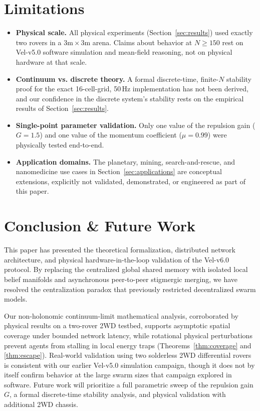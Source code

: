 \documentclass[journal,twoside]{IEEEtran}
\begin{document}
\section{Limitations}
\label{sec:limitations}

\begin{itemize}
    \item \textbf{Physical scale.} All physical experiments (Section~\ref{sec:results}) used exactly two rovers in a $3\text{m} \times 3\text{m}$ arena. Claims about behavior at $N \geq 150$ rest on Vel-v5.0 software simulation and mean-field reasoning, not on physical hardware at that scale.
    \item \textbf{Continuum vs. discrete theory.} A formal discrete-time, finite-$N$ stability proof for the exact 16-cell-grid, 50\,Hz implementation has not been derived, and our confidence in the discrete system's stability rests on the empirical results of Section~\ref{sec:results}.
    \item \textbf{Single-point parameter validation.} Only one value of the repulsion gain ($G = 1.5$) and one value of the momentum coefficient ($\mu = 0.99$) were physically tested end-to-end.
    \item \textbf{Application domains.} The planetary, mining, search-and-rescue, and nanomedicine use cases in Section~\ref{sec:applications} are conceptual extensions, explicitly not validated, demonstrated, or engineered as part of this paper.
\end{itemize}

\section{Conclusion \& Future Work}
\label{sec:conclusion}

This paper has presented the theoretical formalization, distributed network architecture, and physical hardware-in-the-loop validation of the Vel-v6.0 protocol. By replacing the centralized global shared memory with isolated local belief manifolds and asynchronous peer-to-peer stigmergic merging, we have resolved the centralization paradox that previously restricted decentralized swarm models.

Our non-holonomic continuum-limit mathematical analysis, corroborated by physical results on a two-rover 2WD testbed, supports asymptotic spatial coverage under bounded network latency, while rotational physical perturbations prevent agents from stalling in local energy traps (Theorems~\ref{thm:coverage} and \ref{thm:escape}). Real-world validation using two solderless 2WD differential rovers is consistent with our earlier Vel-v5.0 simulation campaign, though it does not by itself confirm behavior at the large swarm sizes that campaign explored in software. Future work will prioritize a full parametric sweep of the repulsion gain $G$, a formal discrete-time stability analysis, and physical validation with additional 2WD chassis.
\end{document}
